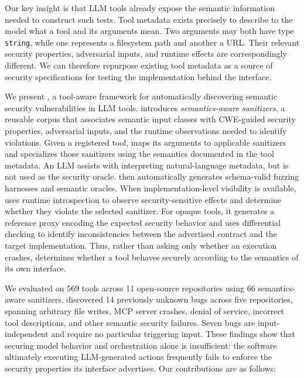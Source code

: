 Our key insight is that LLM tools already expose the semantic information
needed to construct such tests. Tool metadata exists precisely to describe to
the model what a tool and its arguments mean. Two arguments may both have type
\texttt{string}, while one represents a filesystem path and another a URL.
Their relevant security properties, adversarial inputs, and runtime effects
are correspondingly different. We can therefore repurpose existing tool
metadata as a source of security specifications for testing the implementation
behind the interface.

We present \project{}, a tool-aware framework for automatically discovering
semantic security vulnerabilities in LLM tools. \project{} introduces
\emph{semantics-aware sanitizers}, a reusable corpus that associates semantic
input classes with CWE-guided security properties, adversarial inputs, and the
runtime observations needed to identify violations. Given a registered tool,
\project{} maps its arguments to applicable sanitizers and specializes those
sanitizers using the semantics documented in the tool metadata. An LLM assists
with interpreting natural-language metadata, but is not used as the security
oracle.
\project{} then automatically generates schema-valid fuzzing harnesses and
semantic oracles. When implementation-level visibility is available,
\project{} uses runtime introspection to observe security-sensitive effects
and determine whether they violate the selected sanitizer. For opaque tools,
it generates a reference proxy encoding the expected security behavior and
uses differential checking to identify inconsistencies between the advertised
contract and the target implementation. Thus, rather than asking only whether
an execution crashes, \project{} determines whether a tool behaves securely
according to the semantics of its own interface.

We evaluated \project{} on 569 tools across 11 open-source repositories using
66 semantics-aware sanitizers. \project{} discovered 14 previously unknown
bugs across five repositories, spanning arbitrary file writes, MCP server
crashes, denial of service, incorrect tool descriptions, and other semantic
security failures. Seven bugs are input-independent and require no particular
triggering input. These findings show that securing model behavior and
orchestration alone is insufficient: the software ultimately executing
LLM-generated actions frequently fails to enforce the security properties its
interface advertises. Our contributions are as follows:

